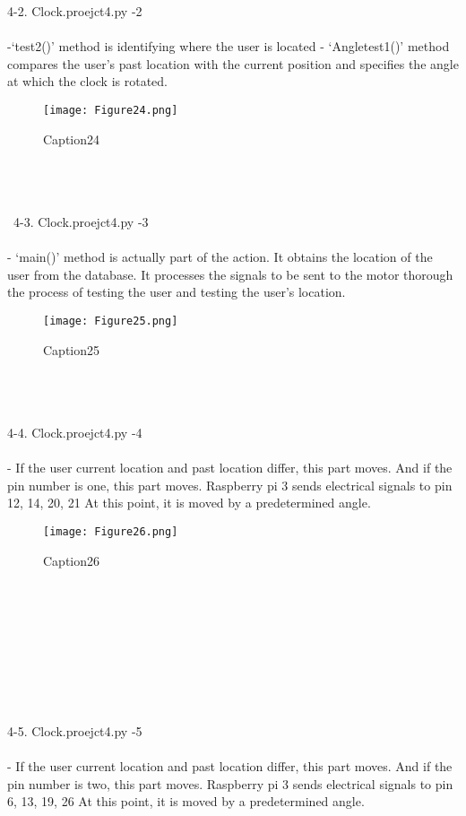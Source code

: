 \documentclass[10pt,a4paper,twocolumn]{report}
\begin{document}
\begin{enumerate}
4-2. Clock.proejct4.py -2 \\\\
-‘test2()’ method is identifying where the user is located
- ‘Angletest1()’ method compares the user’s past location with the current position and specifies the angle at which the clock is rotated. \\
			\begin{figure}[h]
				\texttt{[image: Figure24.png]}
				\caption{Caption24}
				\label{fig24}
			\end{figure}
			\\\\\\\
			4-3. Clock.proejct4.py -3 \\\\
			- ‘main()’ method is actually part of the action. It obtains the location of the user from the database. It processes the signals to be sent to the motor thorough the process of testing the user and testing the user’s location. \\
			\begin{figure}[h]
				\texttt{[image: Figure25.png]}
				\caption{Caption25}
				\label{fig25}
			\end{figure}
			\\\\\\
			4-4. Clock.proejct4.py -4 \\\\
			- If the user current location and past location differ, this part moves. And if the pin number is one, this part moves. Raspberry pi 3 sends electrical signals to pin 12, 14, 20, 21 At this point, it is moved by a predetermined angle.\\
			\begin{figure}[h]
				\texttt{[image: Figure26.png]}
				\caption{Caption26}
				\label{fig26}
			\end{figure}
			\\\\\\\\\\\\\\\\
			4-5. Clock.proejct4.py -5 \\\\
			- If the user current location and past location differ, this part moves. And if the pin number is two, this part moves. Raspberry pi 3 sends electrical signals to pin 6, 13, 19, 26 At this point, it is moved by a predetermined angle. \\

\end{enumerate}
\end{document}
